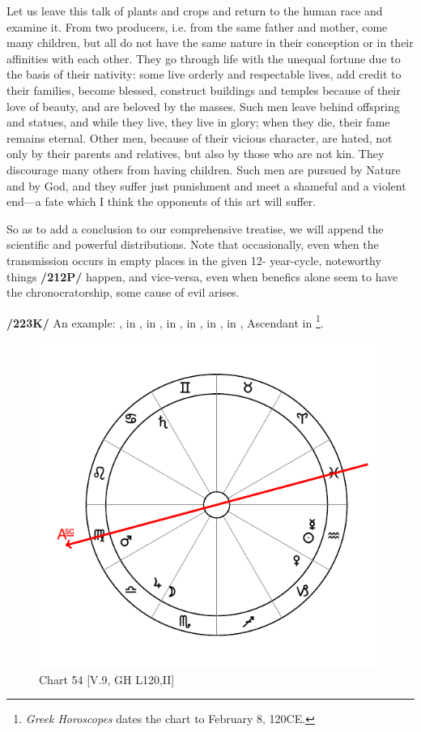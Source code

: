 Let us leave this talk of plants and crops and return to the human race and examine it. From two producers, i.e. from the same father and mother, come many children, but all do not have the same nature
in their conception or in their affinities with each other. They go through life with the unequal fortune due to the basis of their nativity: some live orderly and respectable lives, add credit to their families, become blessed, construct buildings and temples because of their love of beauty, and are beloved by the masses. Such men leave behind offspring and statues, and while they live, they live in glory; when they die, their fame remains eternal. Other men, because of their vicious character, are hated, not only by their parents and
relatives, but also by those who are not kin. They discourage many others from having children. Such men are pursued by Nature and by God, and they suffer just punishment and meet a shameful and a violent end—a fate which I think the opponents of this art will suffer.

So as to add a conclusion to our comprehensive treatise, we will append the scientific and powerful distributions. Note that occasionally, even when the transmission occurs in empty places in the given 12-
year-cycle, noteworthy things \textbf{/212P/} happen, and vice-versa, even when benefics alone seem to have the chronocratorship, some cause of evil arises.

\newpage
\textbf{/223K/} An example: \Sun, \Mercury\xspace in \Aquarius, \Moon\xspace in \Scorpio, \Saturn\xspace in \Cancer, \Jupiter\xspace in \Libra, \Mars\xspace in \Virgo, \Venus\xspace in \Capricorn, Ascendant in \Virgo\footnote{\textit{Greek Horoscopes} dates the chart to February 8, 120CE.}. 

\begin{figure}
\centering
\vspace{-20pt}
\includegraphics[width=.68\textwidth]{charts/5_09_1}
\caption{Chart 54 [V.9, GH L120,II]}
\label{fig:chart54}
\end{figure}

